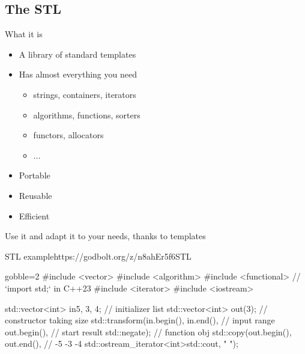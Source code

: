 \subsection[STL]{The STL}

\begin{frame}[fragile]
  \begin{block}{What it is}
    \begin{itemize}
    \item A library of standard templates
    \item Has almost everything you need
      \begin{itemize}
      \item strings, containers, iterators
      \item algorithms, functions, sorters
      \item functors, allocators
      \item ...
      \end{itemize}
    \item Portable
    \item Reusable
    \item Efficient
    \end{itemize}
  \end{block}
  \pause
  \begin{exampleblock}{Use it}
    and adapt it to your needs, thanks to templates
  \end{exampleblock}
\end{frame}

\begin{frame}[fragile]
  \begin{exampleblockGB}{STL example}{https://godbolt.org/z/n8ahEr5f6}{STL}
    \begin{cppcode*}{gobble=2}
      #include <vector>
      #include <algorithm>
      #include <functional>     // `import std;` in C++23
      #include <iterator>
      #include <iostream>

      std::vector<int> in{5, 3, 4};    // initializer list
      std::vector<int> out(3);  // constructor taking size
      std::transform(in.begin(), in.end(),  // input range
                     out.begin(),          // start result
                     std::negate{});       // function obj
      std::copy(out.begin(), out.end(),    // -5 -3 -4
        std::ostream_iterator<int>{std::cout, " "});
    \end{cppcode*}
  \end{exampleblockGB}
\end{frame}


